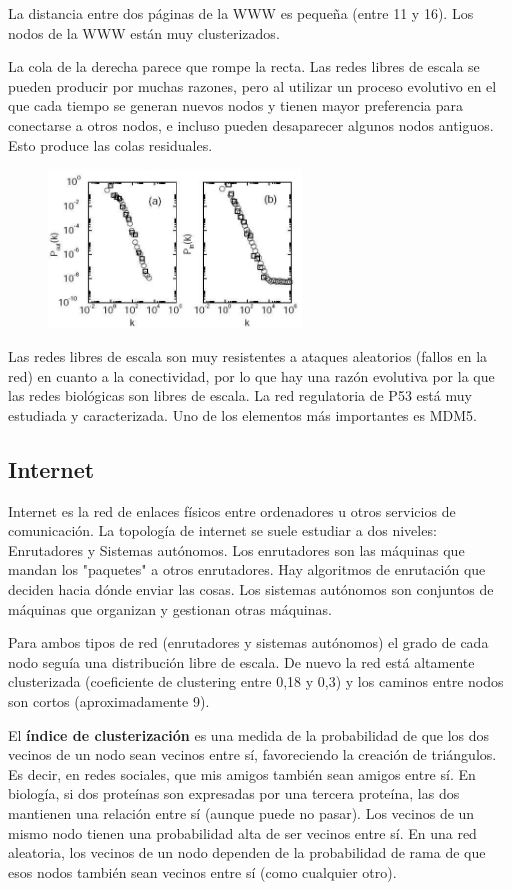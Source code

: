 La distancia entre dos páginas de la WWW es pequeña (entre 11 y 16). Los nodos de la WWW están muy clusterizados.

La cola de la derecha parece que rompe la recta. Las redes libres de escala se pueden producir por muchas razones, pero al utilizar un proceso evolutivo en el que cada tiempo se generan nuevos nodos y tienen mayor preferencia para conectarse a otros nodos, e incluso pueden desaparecer algunos nodos antiguos. Esto produce las colas residuales.

\begin{figure}[h]
\centering
\includegraphics[width = 0.6\textwidth]{figs/www.png}
\end{figure}

Las redes libres de escala son muy resistentes a ataques aleatorios (fallos en la red) en cuanto a la conectividad, por lo que hay una razón evolutiva por la que las redes biológicas son libres de escala. La red regulatoria de P53 está muy estudiada y caracterizada. Uno de los elementos más importantes es MDM5.

\subsection{Internet}
Internet es la red de enlaces físicos entre ordenadores u otros servicios de comunicación. La topología de internet se suele estudiar a dos niveles: Enrutadores y Sistemas autónomos. Los enrutadores son las máquinas que mandan los "paquetes" a otros enrutadores. Hay algoritmos de enrutación que deciden hacia dónde enviar las cosas. Los sistemas autónomos son conjuntos de máquinas que organizan y gestionan otras máquinas.

Para ambos tipos de red (enrutadores y sistemas autónomos) el grado de cada nodo seguía una distribución libre de escala. De nuevo la red está altamente clusterizada (coeficiente de clustering entre 0,18 y 0,3) y los caminos entre nodos son cortos (aproximadamente 9). 

El \textbf{índice de clusterización} es una medida de la probabilidad de que los dos vecinos de un nodo sean vecinos entre sí, favoreciendo la creación de triángulos. Es decir, en redes sociales, que mis amigos también sean amigos entre sí. En biología, si dos proteínas son expresadas por una tercera proteína, las dos mantienen una relación entre sí (aunque puede no pasar). Los vecinos de un mismo nodo tienen una probabilidad alta de ser vecinos entre sí. En una red aleatoria, los vecinos de un nodo dependen de la probabilidad de rama de que esos nodos también sean vecinos entre sí (como cualquier otro).

